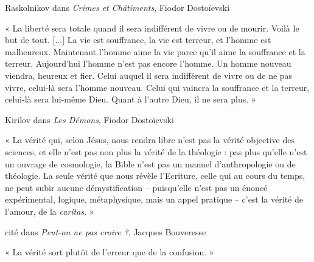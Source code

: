 \documentclass{article}
\begin{document}
\begin{flushright}Raskolnikov dans \textit{Crimes et Châtiments}, Fiodor Dostoïevski\end{flushright}
\vspace{8pt}
\begin{center} « La liberté sera totale quand il sera indifférent de vivre ou de mourir. Voilà le but de tout. [...] La vie est souffrance, la vie est terreur, et l'homme est malheureux. Maintenant l'homme aime la vie parce qu'il aime la souffrance et la terreur. Aujourd'hui l'homme n'est pas encore l'homme. Un homme nouveau viendra, heureux et fier. Celui auquel il sera indifférent de vivre ou de ne pas vivre, celui-là sera l'homme nouveau. Celui qui vaincra la souffrance et la terreur, celui-là sera lui-même Dieu. Quant à l'autre Dieu, il ne sera plus. » \end{center}

\begin{flushright}Kirilov dans \textit{Les Démons}, Fiodor Dostoïevski\end{flushright}
\vspace{8pt}
\begin{center} « La vérité qui, selon Jésus, nous rendra libre n'est pas la vérité objective des sciences, et elle n'est pas non plus la vérité de la théologie : pas plus qu'elle n'est un ouvrage de cosmologie, la Bible n'est pas un manuel d'anthropologie ou de théologie. La seule vérité que nous révèle l'Ecriture, celle qui au cours du temps, ne peut subir aucune démystification – puisqu'elle n'est pas un énoncé expérimental, logique, métaphysique, mais un appel pratique – c'est la vérité de l'amour, de la \textit{caritas}. » \end{center}

\begin{flushright}cité dans \textit{Peut-on ne pas croire ?}, Jacques Bouveresse\end{flushright}
\begin{center} « La vérité sort plutôt de l'erreur que de la confusion. » \end{center}
\end{document}
